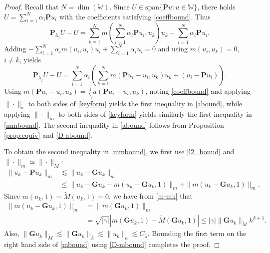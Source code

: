 \documentclass{siamart0516}
\newcommand{\W}{\mathbb{W}}
\newcommand{\bG}{\ensuremath{\boldsymbol G}}
\newcommand{\bP}{\ensuremath{\boldsymbol P}}
\numberwithin{equation}{section}
\numberwithin{theorem}{section}
\numberwithin{figure}{section}
\begin{document}
\begin{proof}
Recall that $N =\dim(\W)$. Since $U\in \text{span}\{\bP u:u\in\W\}$, there holds $U = \sum_{i=1}^N\alpha_i\bP u_i$ with the coefficients satisfying \eqref{coeffbound}.  Thus
	$$
	\bP_{\lambda_j}U - U = \sum_{k=1}^Nm(\sum_{i=1}^N\alpha_i\bP u_i,u_k)u_k - \sum_{i=1}^N\alpha_i\bP u_i.
	$$
	Adding $-\sum_{i=1}^N\alpha_i m(u_i,u_i)u_i + \sum_{i=1}^N\alpha_iu_i = 0$ and using $m(u_i,u_k) = 0$, $i\neq k$, yields
\begin{equation}
	\bP_{\lambda_j}U - U=\sum_{i=1}^N\alpha_i\left(\sum_{k=1}^Nm(\bP u_i-u_i,u_k)u_k +(u_i- \bP u_i) \right).
	\label{keyform}
\end{equation}
Using $m(\bP u_i-u_i,u_k) = \frac{1}{\lambda_j}a(\bP u_i-u_i,u_k)$, noting \eqref{coeffbound} and applying $\|\cdot\|_a$
to both sides of \eqref{keyform} yields the first inequality in \eqref{abound}, while applying $\|\cdot\|_m$ to both sides of \eqref{keyform} yields similarly the first inequality in \eqref{mmbound}. The second inequality in \eqref{abound} follows from Proposition \ref{prop:equiv} and \eqref{D-abound}.

To obtain the second inequality in \eqref{mmbound}, we first use \eqref{l2_bound} and $\|\cdot\|_m\simeq\|\cdot\|_{\tilde{M}}$: 
\begin{equation}\label{mbound}
\begin{aligned}
\|u_k-\bP u_k\|_m & \lesssim \|u_k-\bG u_k\|_m \\ & \leq \|u_k-\bG u_k - m(u_k-\bG u_k,1)\|_m 
+ \|m(u_k-\bG u_k,1)\|_m.
\end{aligned}
\end{equation}
Since $m(u_k,1)=\widetilde{M}(u_k,1)=0$, we have from \eqref{m-mk} that 
\begin{align*}
\|m(u_k-\bG u_k,1)\|_m &= \|m(\bG u_k,1)\|_m
\\
&=\sqrt{|\gamma|}|m(\bG u_k,1) - \widetilde{M}(\bG u_k,1)|\leq |\gamma|\|\bG u_k\|_{\widetilde{M}}h^{k+1}.
\end{align*}
Also, $\|\bG u_k\|_{\widetilde{M}} \lesssim \|\bG u_k\|_{\widetilde{A}}\lesssim \| u_k\|_{a}\lesssim C_\lambda$.
Bounding the first term on the right hand side of \eqref{mbound} using \eqref{D-mbound} completes the proof.						
\end{proof}	
\end{document}
